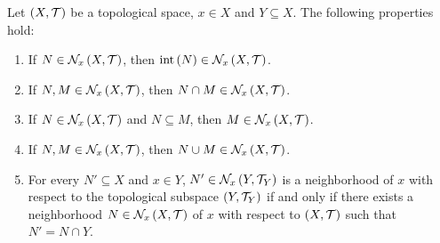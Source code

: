 \begin{proposition}
  Let $\left(X,\mathcal{T}\right)$ be a topological space, $x\in X$ and $Y\subseteq X$. The following properties hold:

  \begin{enumerate}
    \item If $N\in\mathcal{N}_x\left(X,\mathcal{T}\right)$, then $\operatorname{int}\left(N\right)\in\mathcal{N}_x\left(X,\mathcal{T}\right)$.
    \item If $N,M\in\mathcal{N}_x\left(X,\mathcal{T}\right)$, then $N\cap M\in\mathcal{N}_x\left(X,\mathcal{T}\right)$.
    \item If $N\in\mathcal{N}_x\left(X,\mathcal{T}\right)$ and $N\subseteq M$, then $M\in\mathcal{N}_x\left(X,\mathcal{T}\right)$.
    \item If $N,M\in\mathcal{N}_x\left(X,\mathcal{T}\right)$, then $N\cup M\in\mathcal{N}_x\left(X,\mathcal{T}\right)$.
    \item For every $N'\subseteq X$ and $x\in Y$, $N'\in\mathcal{N}_x\left(Y,\mathcal{T}_Y\right)$ is a neighborhood of $x$ with respect to the topological subspace $\left(Y,\mathcal{T}_Y\right)$ if and only if there exists a neighborhood $N\in\mathcal{N}_x\left(X,\mathcal{T}\right)$ of $x$ with respect to $\left(X,\mathcal{T}\right)$ such that $N'=N\cap Y$.
  \end{enumerate}


\end{proposition}
